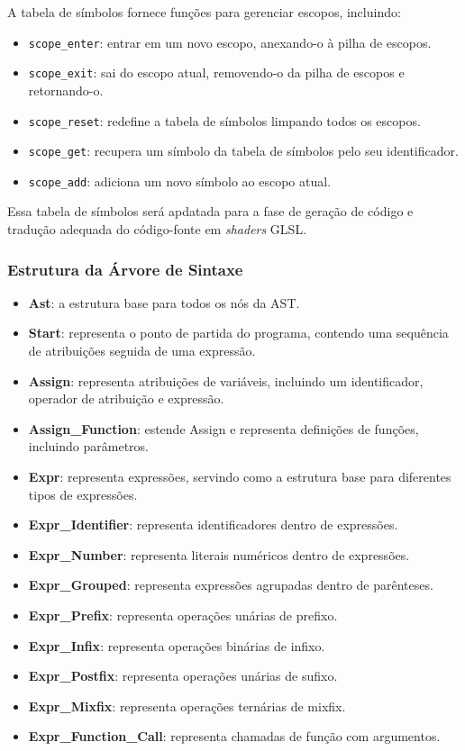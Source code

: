 \documentclass[english, 
               brazil, 
               bsc] %
               {dcomp-abntex2}
\begin{document}
A tabela de símbolos fornece funções para gerenciar escopos, incluindo:
\begin{itemize}
    \item \texttt{scope\_enter}: entrar em um novo escopo, anexando-o à pilha de escopos.
    \item \texttt{scope\_exit}: sai do escopo atual, removendo-o da pilha de escopos e retornando-o.
    \item \texttt{scope\_reset}: redefine a tabela de símbolos limpando todos os escopos.
    \item \texttt{scope\_get}: recupera um símbolo da tabela de símbolos pelo seu identificador.
    \item \texttt{scope\_add}: adiciona um novo símbolo ao escopo atual.
\end{itemize}


Essa tabela de símbolos será apdatada para a fase de geração de código e tradução adequada do código-fonte em \textit{shaders} GLSL.


\subsubsection{Estrutura da Árvore de Sintaxe}

\begin{itemize}
\item \textbf{Ast}: a estrutura base para todos os nós da AST.
\item \textbf{Start}: representa o ponto de partida do programa, contendo uma sequência de atribuições seguida de uma expressão.
\item \textbf{Assign}: representa atribuições de variáveis, incluindo um identificador, operador de atribuição e expressão.
\item \textbf{Assign\_Function}: estende Assign e representa definições de funções, incluindo parâmetros.
\item \textbf{Expr}: representa expressões, servindo como a estrutura base para diferentes tipos de expressões.
\item \textbf{Expr\_Identifier}: representa identificadores dentro de expressões.
\item \textbf{Expr\_Number}: representa literais numéricos dentro de expressões.
\item \textbf{Expr\_Grouped}: representa expressões agrupadas dentro de parênteses.
\item \textbf{Expr\_Prefix}: representa operações unárias de prefixo.
\item \textbf{Expr\_Infix}: representa operações binárias de infixo.
\item \textbf{Expr\_Postfix}: representa operações unárias de sufixo.
\item \textbf{Expr\_Mixfix}: representa operações ternárias de mixfix.
\item \textbf{Expr\_Function\_Call}: representa chamadas de função com argumentos.

\end{itemize}
\end{document}
